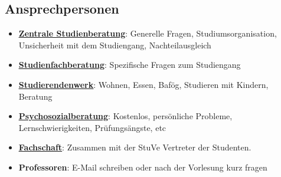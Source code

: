 \documentclass[
	aspectratio=169, 
	10pt 
]{beamer}
\begin{document}
\subsection{Ansprechpersonen}
\begin{frame}{\insertsubsection}
    \begin{itemize}
        \item \underline{\textbf{\href{https://www.uni-ulm.de/studium/studienberatung/zentrale-studienberatung/}{Zentrale Studienberatung}}}: Generelle Fragen, Studiumsorganisation, Unsicherheit mit dem Studiengang, Nachteilausgleich  
        \item \underline{\textbf{\href{https://www.uni-ulm.de/studium/studienberatung/studienfachberatung/}{Studienfachberatung}}}: Spezifische Fragen zum Studiengang 
        \item \underline{\textbf{\href{https://studierendenwerk-ulm.de/}{Studierendenwerk}}}: Wohnen, Essen, Bafög, Studieren mit Kindern, Beratung
        \item \underline{\textbf{\href{https://studierendenwerk-ulm.de/beratung-betreuung/psychosoziale-beratung/}{Psychosozialberatung}}}: Kostenlos, persönliche Probleme, Lernschwierigkeiten, Prüfungsängste, etc
        \item \underline{\textbf{\href{https://stuve.uni-ulm.de/fin/aktuelles}{Fachschaft}}}: {Zusammen mit der StuVe Vertreter der Studenten. }
        \item \textbf{Professoren}: E-Mail schreiben oder nach der Vorlesung kurz fragen
    \end{itemize}
\end{frame}
\end{document}
